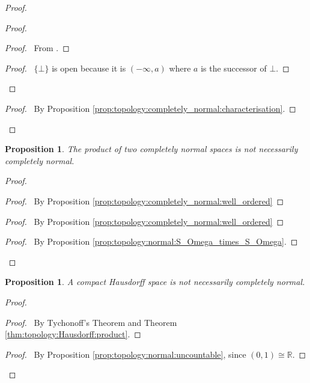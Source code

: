\documentclass{report}
\let\qed\relax
\newtheorem{prop}[lm]{Proposition}
\theoremstyle{definition}
\begin{document}
\begin{proof}
   \begin{proof}
     \begin{proof}
       \pf\ From .
     \end{proof}
     \begin{proof}
       \pf\ $\{ \bot \}$ is open because it is $(- \infty, a)$ where $a$ is the
       successor of $\bot$.
     \end{proof}
   \end{proof}
   \qedstep
   \begin{proof}
     \pf\ By Proposition \ref{prop:topology:completely_normal:characterisation}.
   \end{proof}
   \qed
  \end{proof}

    \begin{prop}
   The product of two completely normal spaces is not necessarily completely
   normal.
  \end{prop}

  \begin{proof}
   \pf
   \begin{proof}
     \pf\ By Proposition \ref{prop:topology:completely_normal:well_ordered}
   \end{proof}
   \begin{proof}
     \pf\ By Proposition \ref{prop:topology:completely_normal:well_ordered}
   \end{proof}
   \begin{proof}
     \pf\ By Proposition \ref{prop:topology:normal:S_Omega_times_S_Omega}.
   \end{proof}
   \qed
  \end{proof}

    \begin{prop}
   A compact Hausdorff space is not necessarily completely normal.
  \end{prop}

  \begin{proof}
    \pf
    \begin{proof}
      \pf\ By Tychonoff's Theorem and Theorem
      \ref{thm:topology:Hausdorff:product}.
    \end{proof}
    \begin{proof}
      \pf\ By Proposition \ref{prop:topology:normal:uncountable}, since $(0, 1)
\cong \mathbb{R}$.
    \end{proof}
    \qed
  \end{proof}
\end{document}
